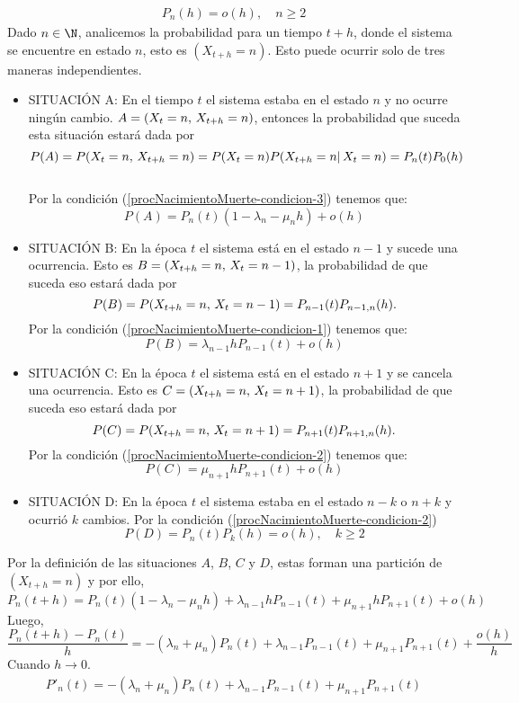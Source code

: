 \begin{eqnarray}
    P_n(h)=o(h),\quad n\geq 2
    \label{procNacimientoMuerte-condicion-4} 
\end{eqnarray}
Dado $n\in\N$, analicemos la probabilidad para un tiempo $t+h$, donde el sistema se encuentre en estado $n$, esto es $(X_{t+h}=n)$. Esto puede ocurrir solo de tres maneras independientes.
\begin{itemize}
     \item SITUACIÓN A: En el tiempo $t$ el sistema estaba en el estado $n$ y no ocurre ningún cambio. $A=(X_t=n,\thinspace X_{t+h}=n)$, entonces la probabilidad que suceda esta situación estará dada por $$P(A)=P(X_t=n,\thinspace X_{t+h}=n)=P(X_t=n)P(X_{t+h}=n|\thinspace X_{t}=n)=P_n(t)P_0(h)$$\\
    Por la condición (\ref{procNacimientoMuerte-condicion-3})
    tenemos que:
    $$P(A)=P_n(t)(1-\lambda_n-\mu_n h)+o(h)$$
    \item SITUACIÓN B: En la época $t$ el sistema está en el estado $n-1$ y sucede una ocurrencia. Esto es $B=(X_{t+h}=n,\thinspace X_t=n-1)$, la probabilidad de que suceda eso estará dada por
    $$P(B)=P(X_{t+h}=n,\thinspace X_t=n-1)=P_{n-1}(t)P_{n-1,n}(h).$$
    Por la condición (\ref{procNacimientoMuerte-condicion-1})
    tenemos que:
    $$P(B)=\lambda_{n-1} h P_{n-1}(t)+o(h)$$
    \item SITUACIÓN C: En la época $t$ el sistema está en el estado $n+1$ y se cancela una ocurrencia. Esto es $C=(X_{t+h}=n,\thinspace X_t=n+1)$, la probabilidad de que suceda eso estará dada por
    $$P(C)=P(X_{t+h}=n,\thinspace X_t=n+1)=P_{n+1}(t)P_{n+1,n}(h).$$
    Por la condición (\ref{procNacimientoMuerte-condicion-2})
    tenemos que:
    $$P(C)=\mu_{n+1} h P_{n+1}(t)+o(h)$$
    \item SITUACIÓN D: En la época $t$ el sistema estaba en el estado $n-k$ o $n+k$ y ocurrió $k$ cambios. Por la condición (\ref{procNacimientoMuerte-condicion-2})
    $$P(D)=P_n(t)P_k(h)=o(h), \quad k\geq 2$$
    \end{itemize}
   Por la definición de las situaciones $A$, $B$, $C$ y $D$, estas forman una partición de $(X_{t+h}=n)$ y por ello, 
    $$P_n(t+h) = P_n(t)(1-\lambda_n-\mu_n h) + \lambda_{n-1} h P_{n-1}(t) + \mu_{n+1} h P_{n+1}(t)+o(h)$$
    Luego, 
    $$\frac{P_n(t+h)-P_n(t)}{h}=-(\lambda_n+\mu_n) P_n(t)+\lambda_{n-1} P_{n-1}(t)+\mu_{n+1}P_{n+1}(t)+\frac{o(h)}{h}$$
    Cuando $h\rightarrow 0$.
\begin{eqnarray}
    P'_n(t)=-(\lambda_n+\mu_n) P_n(t)+\lambda_{n-1}P_{n-1}(t)+\mu_{n+1}P_{n+1}(t)
\label{procNacimientoMuerte-edo-n}
\end{eqnarray}
